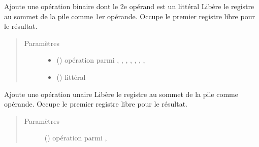 \documentclass[letterpaper,10pt,french]{sphinxmanual}
\begin{document}
\begin{fulllineitems}
\begin{fulllineitems}
\label{\detokenize{compileexpressionmanager:compileexpressionmanager.CompileExpressionManager.pushBinaryOperatorWithLitteral}}
Ajoute une opération binaire dont le 2e opérand est un littéral
Libère le registre au sommet de la pile comme 1er opérande.
Occupe le premier registre libre pour le résultat.
\begin{quote}\begin{description}
\item[{Paramètres}] \leavevmode\begin{itemize}
\item {} 
 () \textendash{} opération parmi \sphinxcode{\sphinxupquote{+}}, \sphinxcode{\sphinxupquote{\sphinxhyphen{}}}, \sphinxcode{\sphinxupquote{*}}, \sphinxcode{\sphinxupquote{/}}, \sphinxcode{\sphinxupquote{\%}}, \sphinxcode{\sphinxupquote{\&}}, \sphinxcode{\sphinxupquote{|}}, \sphinxcode{\sphinxupquote{\textasciicircum{}}}

\item {} 
 ({\hyperref[\detokenize{litteral:litteral.Litteral}]{}}) \textendash{} littéral

\end{itemize}

\end{description}\end{quote}

\end{fulllineitems}


\begin{fulllineitems}
\label{\detokenize{compileexpressionmanager:compileexpressionmanager.CompileExpressionManager.pushUnaryOperator}}
Ajoute une opération unaire
Libère le registre au sommet de la pile comme opérande.
Occupe le premier registre libre pour le résultat.
\begin{quote}\begin{description}
\item[{Paramètres}] \leavevmode
{} () \textendash{} opération parmi \sphinxcode{\sphinxupquote{\textasciitilde{}}}, \sphinxcode{\sphinxupquote{\sphinxhyphen{}}}


\end{description}
\end{quote}
\end{fulllineitems}
\end{fulllineitems}
\end{document}
